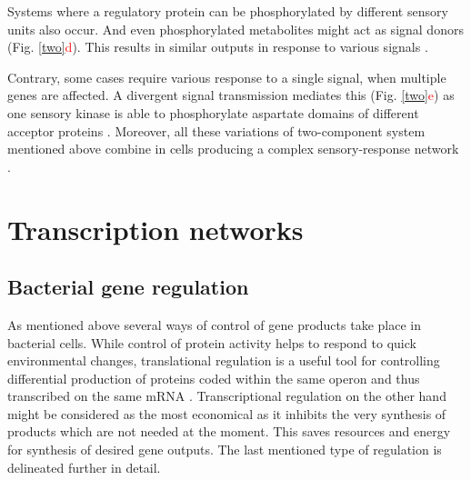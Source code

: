 Systems where a regulatory protein can be phosphorylated by different sensory units also occur.
And even phosphorylated metabolites might act as signal donors (Fig. \ref{two}\textcolor{red}{d}).
This results in similar outputs in response to various signals \cite{kaczmarczyk2014complex, chambonnier2016hybrid}.

Contrary, some cases require various response to a single signal, when multiple genes are affected.
A divergent signal transmission mediates this (Fig. \ref{two}\textcolor{red}{e}) as one sensory kinase is able to phosphorylate aspartate domains of different acceptor proteins \cite{mika2005two, groisman2016feedback}.
Moreover, all these variations of two-component system mentioned above combine in cells producing a complex sensory-response network \cite{kaczmarczyk2014complex, chambonnier2016hybrid}.



\section{Transcription networks}

\subsection{Bacterial gene regulation}
As mentioned above several ways of control of gene products take place in bacterial cells.
While control of protein activity helps to respond to quick environmental changes, translational regulation is a useful tool for controlling differential production of proteins coded within the same operon and thus transcribed on the same mRNA \cite{dar2018extensive}.
Transcriptional regulation on the other hand might be considered as the most economical as it inhibits the very synthesis of products which are not needed at the moment.
This saves resources and energy for synthesis of desired gene outputs.
The last mentioned type of regulation is delineated further in detail.

